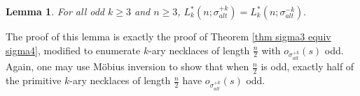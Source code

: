 \documentclass[12pt]{article}
\theoremstyle{plain}
\newtheorem{lemma}[theorem]{Lemma}
\theoremstyle{definition}
\begin{document}
\begin{lemma}\label{lem:alt}
For all odd $k\geq 3$ and $n\geq 3$, $L^*_k(n;\sigma_{alt}^{+k}) = L_k^*(n;\sigma_{alt}^{-k}).$
\end{lemma}
The proof of this lemma is exactly the proof of Theorem \ref{thm sigma3 equiv sigma4}, modified to enumerate $k$-ary necklaces of length $\frac{n}{2}$ with $o_{\sigma_{alt}^{+k}}(s)$ odd. Again, one may use  M\"{o}bius inversion to show that when $\frac{n}{2}$ is odd, exactly half of the primitive $k$-ary necklaces of length $\frac{n}{2}$ have $o_{\sigma_{alt}^{+k}}(s)$ odd.
%
%
%
\end{document}
